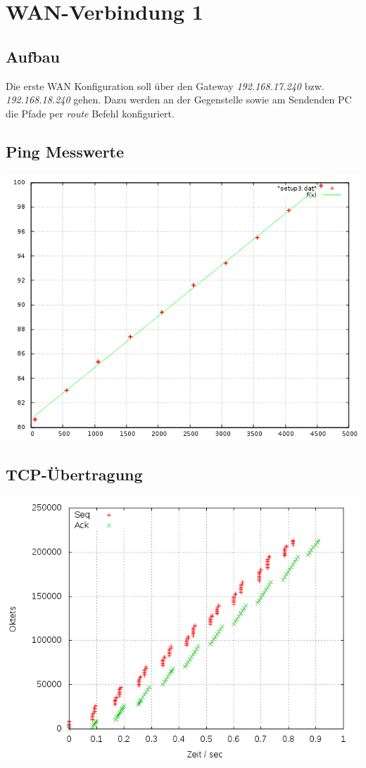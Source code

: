 \documentclass[a4paper,10pt]{article}
\begin{document}
\section{WAN-Verbindung 1}

\subsection{Aufbau}
Die erste WAN Konfiguration soll über den Gateway \textit{192.168.17.240} bzw. \textit{192.168.18.240} gehen. Dazu werden
an der Gegenstelle sowie am Sendenden PC die Pfade per \textit{route} Befehl konfiguriert.

\subsection{Ping Messwerte}
\includegraphics[scale=0.75]{ping_setup_wan1.png}

\subsection{TCP-Übertragung}
\includegraphics[scale=0.75]{setup_wan1.png}
\end{document}

